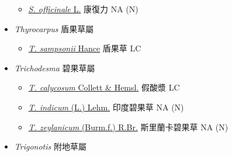 \begin{itemize}
  \begin{itemize}
        \item[] \href{http://www.theplantlist.org/tpl1.1/search?q=Symphytum+officinale}{\textit{S. officinale} L.}   康復力   NA (N)
  \end{itemize}
 \item[] \textit{Thyrocarpus} 盾果草屬
                                
  \begin{itemize}
        \item[] \href{http://www.theplantlist.org/tpl1.1/search?q=Thyrocarpus+sampsonii}{\textit{T. sampsonii} Hance}   盾果草   LC
  \end{itemize}
 \item[] \textit{Trichodesma} 碧果草屬
                                
  \begin{itemize}
        \item[] \href{http://www.theplantlist.org/tpl1.1/search?q=Trichodesma+calycosum}{\textit{T. calycosum} Collett \& Hemsl.}   假酸漿   LC
        \item[] \href{http://www.theplantlist.org/tpl1.1/search?q=Trichodesma+indicum}{\textit{T. indicum} (L.) Lehm.}   印度碧果草   NA (N)
        \item[] \href{http://www.theplantlist.org/tpl1.1/search?q=Trichodesma+zeylanicum}{\textit{T. zeylanicum} (Burm.f.) R.Br.}   斯里蘭卡碧果草   NA (N)
  \end{itemize}
 \item[] \textit{Trigonotis} 附地草屬
                                

\end{itemize}
